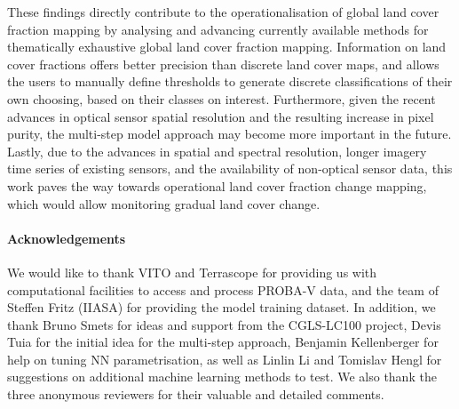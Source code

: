 \documentclass[review,authoryear,3p]{elsarticle}
\newcommand{\minisection}[1]{\paragraph{#1}}%
\begin{document}
These findings directly contribute to the operationalisation of global land cover fraction mapping by analysing and advancing currently available methods for thematically exhaustive global land cover fraction mapping.
Information on land cover fractions offers better precision than discrete land cover maps, and allows the users to manually define thresholds to generate discrete classifications of their own choosing, based on their classes on interest.
Furthermore, given the recent advances in optical sensor spatial resolution and the resulting increase in pixel purity, the multi-step model approach may become more important in the future.
Lastly, due to the advances in spatial and spectral resolution, longer imagery time series of existing sensors, and the availability of non-optical sensor data, this work paves the way towards operational land cover fraction change mapping, which would allow monitoring gradual land cover change.


\minisection{Acknowledgements} We would like to thank VITO and Terrascope for providing us with computational facilities to access and process {PROBA-V} data, and the team of Steffen Fritz (IIASA) for providing the model training dataset. In addition, we thank Bruno Smets for ideas and support from the \gls{CGLS-LC100} project, Devis Tuia for the initial idea for the multi-step approach, Benjamin Kellenberger for help on tuning \gls{NN} parametrisation, as well as Linlin Li and Tomislav Hengl for suggestions on additional machine learning methods to test. We also thank the three anonymous reviewers for their valuable and detailed comments.

\end{document}
